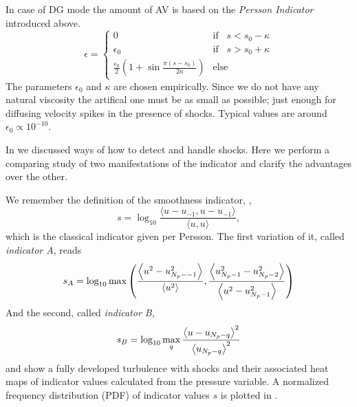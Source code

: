 In case of DG mode the amount of AV is based on the \emph{Persson Indicator}
introduced above.
\begin{equation}
    \epsilon = \begin{cases}
        0 & \text{if}\;\;\; s < s_0 - \kappa \\
        \epsilon_0 & \text{if}\;\;\; s > s_0 + \kappa \\
        \frac{\epsilon_0}{2} \left ( 1 + \sin\frac{\pi(s-s_0)}{2\kappa} \right ) & \text{else}
    \end{cases}
\end{equation}
The parameters $\epsilon_0$ and $\kappa$ are chosen empirically.  Since we do
not have any natural viscosity the artifical one must be as small as possible;
just enough for diffusing velocity spikes in the presence of shocks. Typical
values are around $\epsilon_0 \propto 10^{-10}$.



In  we discussed ways of how to detect and handle shocks.
Here we perform a comparing study of two manifestations of the 
indicator and clarify the advantages over the other.

We remember the definition of the smoothness indicator, ,
\begin{equation}
    s = \log_{10} \frac{\langle u - u_{-1}, u - u_{-1} \rangle}{\langle u, u \rangle},
\end{equation}
which is the classical indicator given per Persson.
The first variation of it, called \emph{indicator A}, reads
\begin{equation}
\label{eqn:indicator-A}
    s_A = \log_{10} \max \left(
        \frac{\left\langle u^2 - u_{N_p--1}^2\right\rangle}{\left\langle u^2\right\rangle},
        \frac{\left\langle u_{N_p-1}^2 - u_{N_p-2}^2\right\rangle}{\left\langle u^2 - u_{N_p-1}^2\right\rangle}
    \right)
\end{equation}
And the second, called \emph{indicator B},
\begin{equation}
    s_B = \log_{10} \max_q \frac{\left\langle u - u_{N_p-q}\right\rangle^2}{\left\langle u_{N_p-q}\right\rangle^2}
\end{equation}
 and  show a fully
developed turbulence with shocks and their associated heat maps of indicator
values calculated from the pressure variable. A normalized frequency
distribution (PDF) of indicator values $s$ is plotted in .


